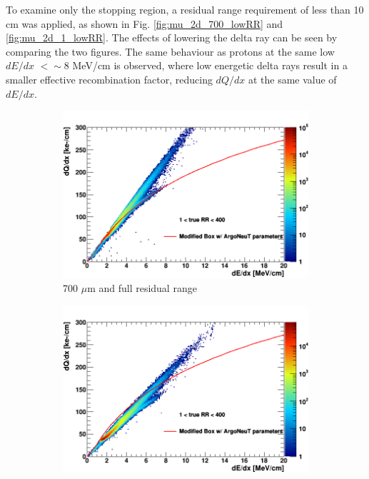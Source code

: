 To examine only the stopping region, a residual range requirement of less than 10 cm was applied, as shown in Fig. \ref{fig:mu_2d_700_lowRR} and \ref{fig:mu_2d_1_lowRR}.
The effects of lowering the delta ray can be seen by comparing the two figures. 
The same behaviour as protons at the same low $dE/dx$ $<\sim8$ MeV/cm is observed, where low energetic delta rays result in a smaller effective recombination factor, reducing $dQ/dx$ at the same value of $dE/dx$.


\begin{figure}[hp!]
        \centering
        \begin{subfigure}[b]{0.495\textwidth}
            \centering
            \includegraphics[width=\textwidth]{mu_700um}
            \caption{700 $\mu$m and full residual range}%
            \label{fig:mu_2d_700}
        \end{subfigure}
        \hfill
        \begin{subfigure}[b]{0.495\textwidth}  
            \centering 
            \includegraphics[width=\textwidth]{mu_1um}

\end{subfigure}
\end{figure}
